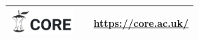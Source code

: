 \documentclass{beamer}
\begin{document}
\begin{frame}
\begin{tabular}{L{.3\textwidth}{1cm}cp{.6\textwidth}}
	\includegraphics[height=1cm]{..//img/Bweb02-ri-gmail/core-logo.png} & 
	& 
	\url{https://core.ac.uk/} \\
	
	\hline
	
\end{tabular}


\end{frame}
\end{document}
